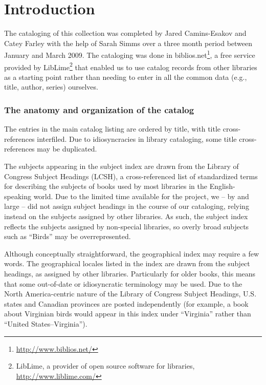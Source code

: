 \chapter*{Introduction}

The cataloging of this collection was completed by Jared Camins-Esakov and Catey
Farley with the help of Sarah Simms over a three month period between January
and March 2009. The cataloging was done in
{\ddag}biblios.net\footnote{\url{http://www.biblios.net/}}, a free service provided
by LibLime\footnote{LibLime, a provider of open source software for libraries,
\url{http://www.liblime.com/}} that enabled us to use catalog records from other
libraries as a starting point rather than needing to enter in all the common
data (e.g., title, author, series) ourselves.

\subsection*{The anatomy and organization of the catalog}

The entries in the main catalog listing are ordered by title, with title
cross-references interfiled. Due to idiosyncracies in library cataloging, some
title cross-references may be duplicated.

The subjects appearing in the subject index are drawn from the Library of
Congress Subject Headings (LCSH), a cross-referenced list of standardized terms
for describing the subjects of books used by most libraries in the
English-speaking world. Due to the limited time available for the project,
we -- by and large -- did not assign subject headings in the course of our
cataloging, relying instead on the subjects assigned by other libraries. As
such, the subject index reflects the subjects assigned by non-special libraries,
so overly broad subjects such as ``Birds'' may be overrepresented.

Although conceptually straightforward, the geographical index may require a few
words. The geographical locales listed in the index are drawn from the subject
headings, as assigned by other libraries. Particularly for older books, this
means that some out-of-date or idiosyncratic terminology may be used. Due to the
North America-centric nature of the Library of Congress Subject Headings, U.S.
states and Canadian provinces are posted independently (for example, a book about
Virginian birds would appear in this index under ``Virginia'' rather than ``United
States--Virginia'').

